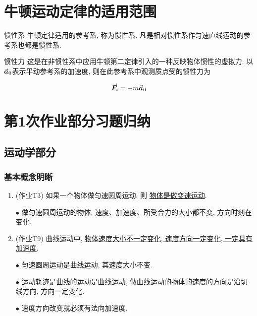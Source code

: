 \section{牛顿运动定律的适用范围} \label{2.3}

\begin{definition} \label{C2-df2}
	
	{\heiti 惯性系} 牛顿定律适用的参考系, 称为惯性系. 凡是相对惯性系作匀速直线运动的参考系也都是惯性系. 
	
	{\heiti 惯性力} 这是在非惯性系中应用牛顿第二定律引入的一种反映物体惯性的虚拟力. 以$\va*{a}_0$表示平动参考系的加速度, 则在此参考系中观测质点受的惯性力为
	
	\begin{equation}
		\va*{F}_i = -m \va*{a}_0 \label{C2-eq16}
	\end{equation}
	
\end{definition}

\section{第1次作业部分习题归纳} \label{2.4}

\subsection{运动学部分}

\subsubsection{基本概念明晰}

\begin{enumerate}
	
	\item (作业T3) 如果一个物体做匀速圆周运动, 则 \uline{物体是做变速运动}. 
	
	\vskip 0.1cm
	
	\begin{solution}
		$\bullet$ 做匀速圆周运动的物体, 速度、加速度、所受合力的大小都不变, 方向时刻在变化. 
	\end{solution}
	
	\vskip 0.3cm
	
	\item (作业T9) 曲线运动中, \uline{物体速度大小不一定变化, 速度方向一定变化, 一定具有加速度}. 
	
	\vskip 0.1cm
	
	\begin{solution}
		
		$\bullet$ 匀速圆周运动是曲线运动, 其速度大小不变.
		
		$\bullet$ 运动轨迹是曲线的运动是曲线运动, 做曲线运动的物体的速度的方向是沿切线方向, 方向一定变化. 
		
		$\bullet$ 速度方向改变就必须有法向加速度. 
		
	\end{solution}
	
\end{enumerate}

